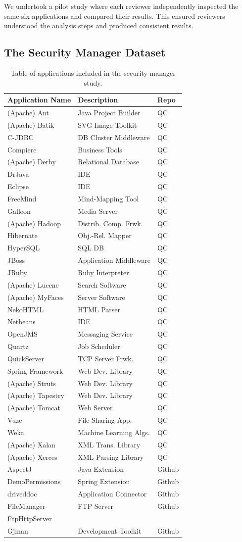 \documentclass{sig-alternate}
\begin{document}
We undertook a pilot study where each reviewer
independently inspected the same six applications and compared their
results. This ensured reviewers understood the analysis steps and produced
consistent results.

\subsection{The Security Manager Dataset}\label{sec:Applications-Studied}

\begin{table}
\caption{Table of applications included in the security manager study.}
\label{Table:applications-studied}


\centering{}%
\begin{tabular}{lll}
\toprule 
Application Name & Description & Repo\tabularnewline
\midrule
(Apache) Ant & Java Project Builder & QC\tabularnewline
(Apache) Batik & SVG Image Toolkit & QC\tabularnewline
C-JDBC & DB Cluster Middleware & QC\tabularnewline
Compiere & Business Tools & QC\tabularnewline
(Apache) Derby & Relational Database & QC\tabularnewline
DrJava & IDE & QC\tabularnewline
Eclipse  & IDE & QC\tabularnewline
FreeMind & Mind-Mapping Tool & QC\tabularnewline
Galleon & Media Server & QC\tabularnewline
(Apache) Hadoop & Distrib. Comp. Frwk. & QC\tabularnewline
Hibernate & Obj.-Rel. Mapper & QC\tabularnewline
HyperSQL & SQL DB & QC\tabularnewline
JBoss & Application Middleware & QC\tabularnewline
JRuby & Ruby Interpreter & QC\tabularnewline
(Apache) Lucene & Search Software & QC\tabularnewline
(Apache) MyFaces & Server Software & QC\tabularnewline
NekoHTML & HTML Parser & QC\tabularnewline
Netbeans & IDE & QC\tabularnewline
OpenJMS & Messaging Service & QC\tabularnewline
Quartz  & Job Scheduler & QC\tabularnewline
QuickServer & TCP Server Frwk. & QC\tabularnewline
Spring Framework & Web Dev. Library & QC\tabularnewline
(Apache) Struts & Web Dev. Library & QC\tabularnewline
(Apache) Tapestry & Web Dev. Library & QC\tabularnewline
(Apache) Tomcat & Web Server & QC\tabularnewline
Vuze & File Sharing App. & QC\tabularnewline
Weka & Machine Learning Algs. & QC\tabularnewline
(Apache) Xalan & XML Trans. Library & QC\tabularnewline
(Apache) Xerces & XML Parsing Library & QC\tabularnewline
AspectJ & Java Extension & Github\tabularnewline
DemoPermissions & Spring Extension & Github\tabularnewline
driveddoc & Application Connector & Github\tabularnewline
FileManager- & FTP Server & Github \\ FtpHttpServer\tabularnewline
Gjman & Development Toolkit & Github\tabularnewline

\end{tabular}
\end{table}
\end{document}
